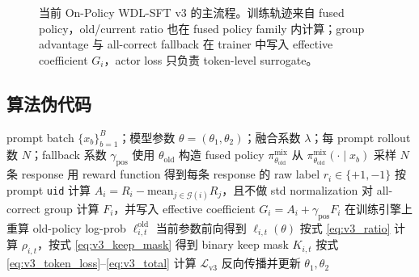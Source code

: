 \begin{figure}[htbp]
\caption{当前 On-Policy WDL-SFT v3 的主流程。训练轨迹来自 fused policy，old/current ratio 也在 fused policy family 内计算；group advantage 与 all-correct fallback 在 trainer 中写入 effective coefficient $G_i$，actor loss 只负责 token-level surrogate。}
\label{fig:wdl_sft_flow}
\end{figure}

\subsection{算法伪代码}
\label{subsec:algorithm}

\begin{algorithm}[H]
\caption{On-Policy WDL-SFT v3 的一个训练步}
\label{alg:wdl_sft_v3}
\begin{algorithmic}[1]
\Require prompt batch $\{x_b\}_{b=1}^{B}$；模型参数 $\theta=(\theta_1,\theta_2)$；融合系数 $\lambda$；每 prompt rollout 数 $N$；fallback 系数 $\gamma_{\mathrm{pos}}$
\State 使用 $\theta_{\mathrm{old}}$ 构造 fused policy $\pi_{\theta_{\mathrm{old}}}^{\mathrm{mix}}$
    \State 从 $\pi_{\theta_{\mathrm{old}}}^{\mathrm{mix}}(\cdot\mid x_b)$ 采样 $N$ 条 response
\EndFor
\State 用 reward function 得到每条 response 的 raw label $r_i\in\{+1,-1\}$
\State 按 prompt \texttt{uid} 计算 $A_i=R_i-\mathrm{mean}_{j\in\mathcal{G}(i)}R_j$，且不做 std normalization
\State 对 all-correct group 计算 $F_i$，并写入 effective coefficient $G_i=A_i+\gamma_{\mathrm{pos}}F_i$
\State 在训练引擎上重算 old-policy log-prob $\ell^{\mathrm{old}}_{i,t}$
\State 当前参数前向得到 $\ell_{i,t}(\theta)$
\State 按式 \eqref{eq:v3_ratio} 计算 $\rho_{i,t}$，按式 \eqref{eq:v3_keep_mask} 得到 binary keep mask $K_{i,t}$
\State 按式 \eqref{eq:v3_token_loss}--\eqref{eq:v3_total} 计算 $\mathcal{L}_{\mathrm{v3}}$
\State 反向传播并更新 $\theta_1,\theta_2$
\end{algorithmic}
\end{algorithm}

